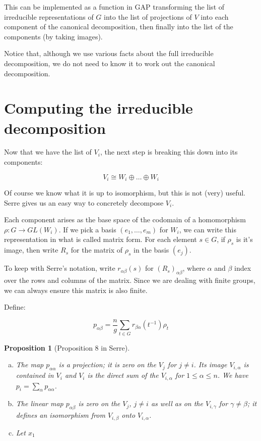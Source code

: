 \documentclass{article}
\newtheorem*{proposition}{Proposition}
\begin{document}
This can be implemented as a function in GAP transforming the list of
irreducible representations of $G$ into the list of projections of $V$
into each component of the canonical decomposition, then finally into
the list of the components (by taking images).

Notice that, although we use various facts about the full irreducible
decomposition, we do not need to know it to work out the canonical
decomposition.

\section{Computing the irreducible decomposition}

Now that we have the list of $V_i$, the next step is breaking this
down into its components:

$$V_i \cong W_i \oplus \ldots \oplus W_i$$

Of course we know what it is up to isomorphism, but this is not (very)
useful. Serre gives us an easy way to concretely decompose $V_i$.

Each component arises as the base space of the codomain of a
homomorphism $\rho : G \to GL(W_i)$. If we pick a basis $(e_1, \ldots,
e_m)$ for $W_i$, we can write this representation in what is called
matrix form. For each element $s \in G$, if $\rho_s$ is it's image,
then write $R_s$ for the matrix of $\rho_s$ in the basis $(e_j)$.

To keep with Serre's notation, write $r_{\alpha\beta}(s)$ for
$(R_s)_{\alpha\beta}$, where $\alpha$ and $\beta$ index over the rows
and columns of the matrix. Since we are dealing with finite groups, we
can always ensure this matrix is also finite.

Define:

\begin{equation}
p_{\alpha\beta} = \frac{n}{g}\sum_{t \in G} r_{\beta\alpha}(t^{-1})\rho_t \tag{$*$}
\end{equation}

\begin{proposition}[Proposition 8 in Serre]\ \\
\vspace{-1em}
\begin{enumerate}[(a)]
  \item The map $p_{\alpha\alpha}$ is a projection; it is zero on the
    $V_j$ for $j \neq i$. Its image $V_{i,\alpha}$ is contained in
    $V_i$ and $V_i$ is the direct sum of the $V_{i,\alpha}$ for $1
    \leq \alpha \leq n$. We have $p_i = \sum_\alpha p_{\alpha\alpha}$.

  \item The linear map $p_{\alpha\beta}$ is zero on the $V_j$, $j \neq
    i$ as well as on the $V_{i,\gamma}$ for $\gamma \neq \beta$; it
    defines an isomorphism from $V_{i, \beta}$ onto $V_{i, \alpha}$.

  \item Let $x_1$
\end{enumerate}
\end{proposition}
\end{document}
